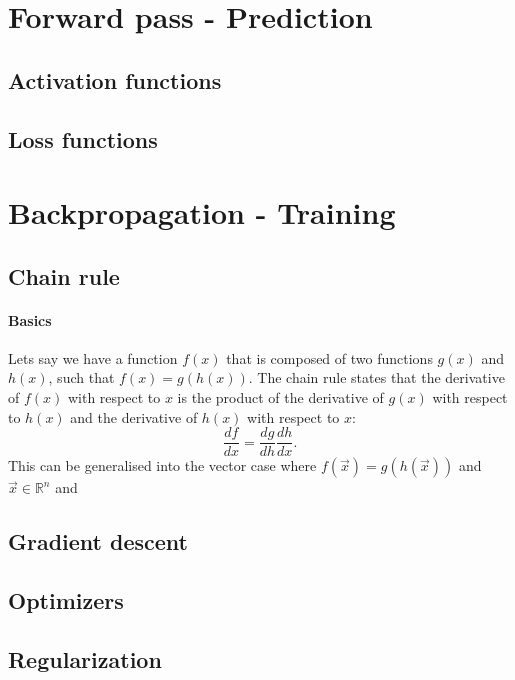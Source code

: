 %
%

\section{Forward pass - Prediction}
    \subsection{Activation functions}
    \subsection{Loss functions}

\section{Backpropagation - Training}
    \subsection{Chain rule}
        \paragraph{Basics}
        Lets say we have a function $f(x)$ that is composed of two functions $g(x)$ and $h(x)$, such that $f(x) = g(h(x))$. The chain rule states that the derivative of $f(x)$ with respect to $x$ is the product of the derivative of $g(x)$ with respect to $h(x)$ and the derivative of $h(x)$ with respect to $x$:
        \begin{equation}
            \frac{df}{dx} = \frac{dg}{dh} \frac{dh}{dx}.
        \end{equation}
        This can be generalised into the vector case where $f(\vec{x}) = g(h(\vec{x}))$ and $\vec{x} \in \mathbb{R}^n$ and 
    \subsection{Gradient descent}
    \subsection{Optimizers}
    \subsection{Regularization} %




